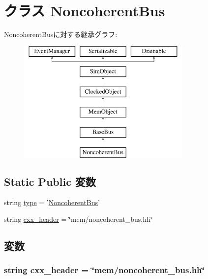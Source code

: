 \hypertarget{classBus_1_1NoncoherentBus}{
\section{クラス NoncoherentBus}
\label{classBus_1_1NoncoherentBus}
}
NoncoherentBusに対する継承グラフ:\begin{figure}[H]
\begin{center}
\leavevmode
\includegraphics[height=6cm]{classBus_1_1NoncoherentBus}
\end{center}
\end{figure}
\subsection*{Static Public 変数}
\begin{DoxyCompactItemize}
\item 
string \hyperlink{classBus_1_1NoncoherentBus_acce15679d830831b0bbe8ebc2a60b2ca}{type} = '\hyperlink{classBus_1_1NoncoherentBus}{NoncoherentBus}'
\item 
string \hyperlink{classBus_1_1NoncoherentBus_a17da7064bc5c518791f0c891eff05fda}{cxx\_\-header} = \char`\"{}mem/noncoherent\_\-bus.hh\char`\"{}
\end{DoxyCompactItemize}


\subsection{変数}
\hypertarget{classBus_1_1NoncoherentBus_a17da7064bc5c518791f0c891eff05fda}{
\subsubsection[{cxx\_\-header}]{\setlength{\rightskip}{0pt plus 5cm}string {\bf cxx\_\-header} = \char`\"{}mem/noncoherent\_\-bus.hh\char`\"{}}}
\label{classBus_1_1NoncoherentBus_a17da7064bc5c518791f0c891eff05fda}



